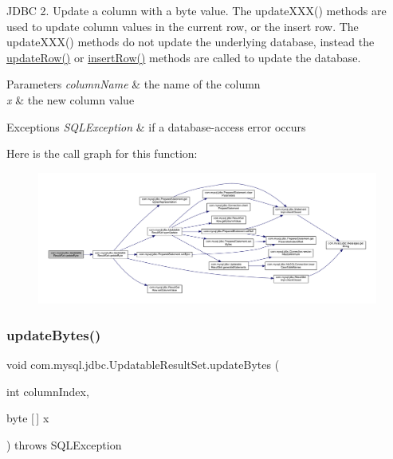 J\+D\+BC 2. Update a column with a byte value. The update\+X\+X\+X() methods are used to update column values in the current row, or the insert row. The update\+X\+X\+X() methods do not update the underlying database, instead the \mbox{\hyperlink{classcom_1_1mysql_1_1jdbc_1_1_updatable_result_set_a919969ba4b3c7cbc7b18605e9f31a746}{update\+Row()}} or \mbox{\hyperlink{classcom_1_1mysql_1_1jdbc_1_1_updatable_result_set_aef041f8d9d0778083716fc26652648fa}{insert\+Row()}} methods are called to update the database.


\begin{DoxyParams}{Parameters}
{\em column\+Name} & the name of the column \\
\hline
{\em x} & the new column value\\
\hline
\end{DoxyParams}

\begin{DoxyExceptions}{Exceptions}
{\em S\+Q\+L\+Exception} & if a database-\/access error occurs \\
\hline
\end{DoxyExceptions}
Here is the call graph for this function\+:
\nopagebreak
\begin{figure}[H]
\begin{center}
\leavevmode
\includegraphics[width=350pt]{classcom_1_1mysql_1_1jdbc_1_1_updatable_result_set_afcff8e1503aeeb94781ec5e18c5cf13d_cgraph}
\end{center}
\end{figure}
\mbox{\label{classcom_1_1mysql_1_1jdbc_1_1_updatable_result_set_a08a332f7047e0f8cec9b2b0197b38fbf}} 
\subsubsection{\texorpdfstring{update\+Bytes()}{updateBytes()}\hspace{0.1cm}{\footnotesize\ttfamily [1/2]}}
{\footnotesize\ttfamily void com.\+mysql.\+jdbc.\+Updatable\+Result\+Set.\+update\+Bytes (\begin{DoxyParamCaption}\item[{int}]{column\+Index,  }\item[{byte \mbox{[}$\,$\mbox{]}}]{x }\end{DoxyParamCaption}) throws S\+Q\+L\+Exception}

